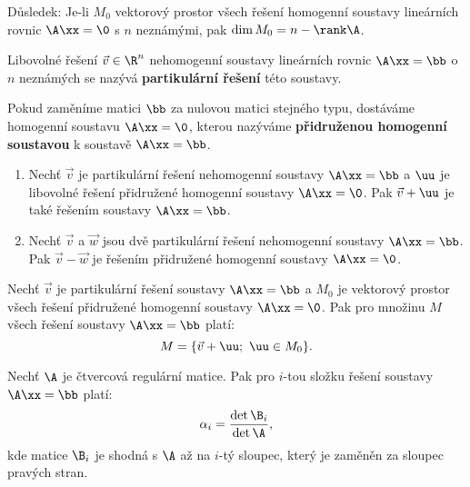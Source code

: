 Důsledek: Je-li $M_0$ vektorový prostor všech řešení homogenní soustavy lineárních rovnic $\A\xx=\0$ s $n$ neznámými, pak $\dim M_0=n-\rank\A$.
  
\begin{df}
Libovolné řešení $\vec v\in\R^n$ nehomogenní soustavy lineárních rovnic $\A\xx=\bb$ o $n$ neznámých se nazývá {\bf partikulární řešení} této soustavy.

Pokud zaměníme matici $\bb$ za nulovou matici stejného typu, dostáváme homogenní soustavu $\A\xx=\0$, kterou nazýváme {\bf přidruženou homogenní soustavou} k soustavě $\A\xx=\bb$.
\end{df}
  
\begin{veta}
\begin{enumerate}
\item Nechť $\vec v$ je partikulární řešení nehomogenní soustavy $\A\xx=\bb$ a $\uu$ je libovolné řešení přidružené homogenní soustavy $\A\xx=\0$.
Pak $\vec v+\uu$ je také řešením soustavy $\A\xx=\bb$.
\item Nechť $\vec v$ a $\vec w$ jsou dvě partikulární řešení nehomogenní soustavy $\A\xx=\bb$.
Pak $\vec v-\vec w$ je řešením přidružené homogenní soustavy $\A\xx=\0$.
\end{enumerate}
\end{veta}
  
\begin{veta}
Nechť $\vec v$ je partikulární řešení soustavy $\A\xx=\bb$ a $M_0$ je vektorový prostor všech řešení přidružené homogenní soustavy $\A\xx=\0$.
Pak pro množinu $M$ všech řešení soustavy $\A\xx=\bb$ platí:
$$ M=\{\vec v+\uu;~\uu\in M_0\}. $$
\end{veta}
  
\begin{veta}
Nechť $\A$ je čtvercová regulární matice.
Pak pro $i$-tou složku řešení soustavy $\A\xx=\bb$ platí:
$$ \alpha_i = \frac{\det\B_i}{\det\A}, $$
kde matice $\B_i$ je shodná s $\A$ až na $i$-tý sloupec, který je zaměněn za sloupec pravých stran.
\end{veta}